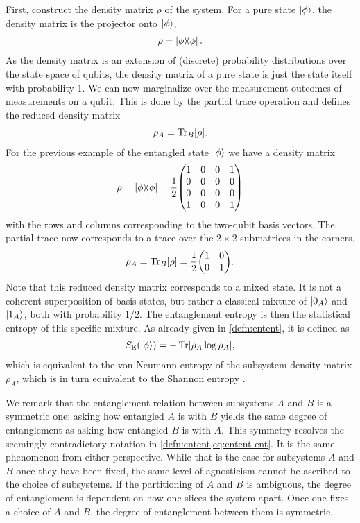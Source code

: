 First, construct the density matrix $\rho$ of the system. For a pure state
$\ket{\phi}$, the density matrix is the projector onto $\ket{\phi}$,
\begin{align}
  \rho = \dyad{\phi}
.\end{align}
As the density matrix is an extension of (discrete) probability distributions
over the state space of qubits, the density matrix of a pure state is just the
state itself with probability 1. We can now marginalize over the measurement
outcomes of measurements on a qubit. This is done by the partial trace
operation and defines the reduced density matrix
\begin{align}
  \rho_A = \Tr_B[\rho]
.\end{align}
For the previous example of the entangled state $\ket{\phi}$ we have a density
matrix
\begin{align}
  \rho = \dyad{\phi} 
  = \frac{1}{2} \mqty(1 & 0 & 0 & 1 \\
                      0 & 0 & 0 & 0 \\
                      0 & 0 & 0 & 0 \\
                      1 & 0 & 0 & 1)
\end{align}
with the rows and columns corresponding to the two-qubit basis vectors. The
partial trace now corresponds to a trace over the $2\times 2$ submatrices in
the corners,
\begin{align}
  \rho_A = \Tr_B[\rho] = \frac{1}{2}\mqty(\imat{2})
.\end{align}
Note that this reduced density matrix corresponds to a mixed state. It is not a
coherent superposition of basis states, but rather a classical mixture of
$\ket{0_A}$ and $\ket{1_A}$, both with probability $1 /2$. The entanglement
entropy is then the statistical entropy of this specific mixture. As already
given in \cref{defn:entent}, it is defined as
\begin{align}\label{eq:entent-ent}
  S_\mathrm{E}(\ket{\phi}) = -\Tr[\rho_A \log \rho_A] 
,\end{align}
which is equivalent to the von Neumann entropy of the subsystem density matrix
$\rho_A$, which is in turn equivalent to the Shannon entropy
\cite{vonneumannMathematischeGrundlagenQuantenmechanik1968,shannonMathematicalTheoryCommunication1948}.

We remark that the entanglement relation between subsystems $A$ and $B$ is a
symmetric one: asking how entangled $A$ is with $B$ yields the same degree of
entanglement as asking
how entangled $B$ is with $A$. This symmetry resolves the seemingly
contradictory notation in \cref{defn:entent,eq:entent-ent}. It is the same
phenomenon from either perspective. While that is the case for subsystems $A$
and $B$ once they have been fixed, the same level of agnosticism cannot be
ascribed to the choice of subsystems. If the partitioning of $A$ and $B$ is
ambiguous, the degree of entanglement is dependent on how one slices the system
apart. Once one fixes a choice of $A$ and $B$, the degree of entanglement
between them is symmetric.


